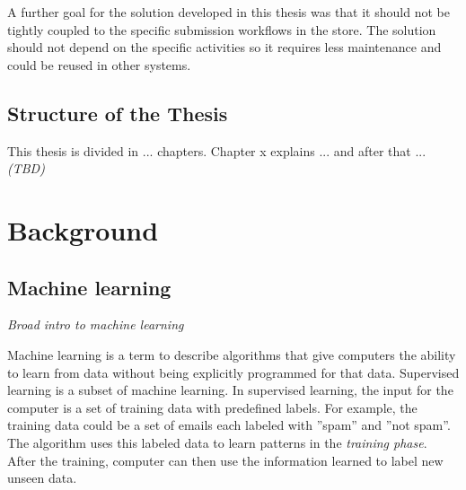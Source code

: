 \documentclass[english,12pt,a4paper,pdftex,sci,utf8]{aaltothesis}
\newcommand{\nyi}[1]{\colorbox{nyibg}{\textcolor{nyitext}{\emph{#1}}}}
\begin{document}
A further goal for the solution developed in this thesis was that it should not be tightly coupled to the 
specific submission workflows in the store. The solution should not depend on the specific activities so
it requires less maintenance and could be reused in other systems.

\subsection{Structure of the Thesis}
This thesis is divided in ... chapters. Chapter x explains ... and after that ... 
\nyi{(TBD)}


\clearpage
\section{Background}
\label{sec:background}

\subsection{Machine learning}

\nyi{Broad intro to machine learning}

Machine learning is a term to describe algorithms that give computers the ability to learn from data without being explicitly programmed for that data. Supervised learning is a subset of machine learning. In supervised learning, the input for the computer is a set of training data with predefined labels. For example, the training data could be a set of emails each labeled with ''spam'' and ''not spam''. The algorithm uses this labeled data to learn patterns in the \emph{training phase}. After the training, computer can then use the information learned to label new unseen data.
\end{document}
